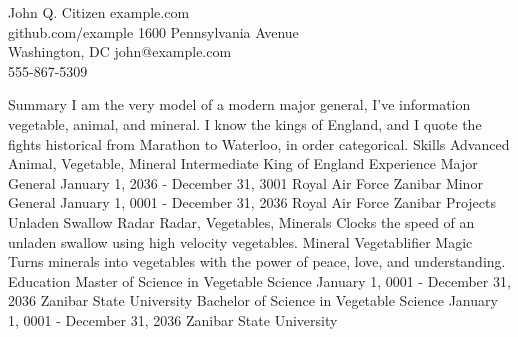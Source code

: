 \documentclass{resume}
\begin{document}
    \resumetitle
        {John Q. Citizen}
        {
            example.com\\
            github.com/example
        }
        {
            1600 Pennsylvania Avenue\\
            Washington, DC
        }
        {
            john@example.com\\
            555-867-5309
        }
    
    \resumesection
        {Summary}
        {
            I am the very model of a modern major general, 
            I've information vegetable, animal, and mineral.
            I know the kings of England, and I quote the fights historical
            from Marathon to Waterloo, in order categorical.
        }
    \resumesection
        {Skills}
        {
            \skillsection
                {Advanced}
                {Animal, Vegetable, Mineral}
            \skillsection
                {Intermediate}
                {King of England}
        }
    \resumesection
        {Experience}
        {
            \experience
                {Major General}
                {January 1, 2036 - December 31, 3001}
                {Royal Air Force}
                {Zanibar}
                {
                    \lipsum*[1]
                }
            \experience
                {Minor General}
                {January 1, 0001 - December 31, 2036}
                {Royal Air Force}
                {Zanibar}
                {
                    \lipsum*[1]
                }
        }
    \resumesection
        {Projects}
        {
            \project
                {Unladen Swallow Radar}
                {Radar, Vegetables, Minerals}
                {
                    Clocks the speed of an unladen swallow using high
                    velocity vegetables.
                }
            \project
                {Mineral Vegetablifier}
                {Magic}
                {
                    Turns minerals into vegetables with the power of
                    peace, love, and understanding.
                }
        }
    \resumesection
        {Education}
        {
            \education
                {Master of Science in Vegetable Science}
                {January 1, 0001 - December 31, 2036}
                {Zanibar State University}
            \education
                {Bachelor of Science in Vegetable Science}
                {January 1, 0001 - December 31, 2036}
                {Zanibar State University}
        }
\end{document}
